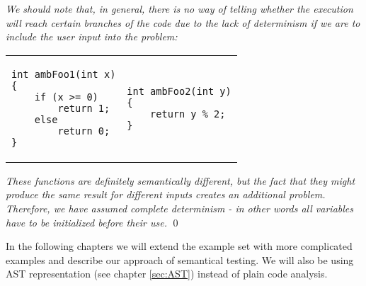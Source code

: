 \begin{exmp}
\textit{We should note that, in general, there is no way of telling whether the execution will reach certain branches of the code due to the lack of determinism if we are to include the user input into the problem:}

\begin{tabular}{ p{4.5cm} p{4.5cm} }
\begin{lstlisting}
int ambFoo1(int x)
{
    if (x >= 0)
        return 1;
    else
        return 0;
}
\end{lstlisting}
&
\begin{lstlisting}
int ambFoo2(int y)
{
    return y % 2;
}
\end{lstlisting}
\end{tabular}

\textit{These functions are definitely semantically different, but the fact that they might produce the same result for different inputs creates an additional problem. Therefore, we have assumed complete determinism - in other words all variables have to be initialized before their use.}
\qed
\end{exmp}

In the following chapters we will extend the example set with more complicated examples and describe our approach of semantical testing. We will also be using AST representation (see chapter \ref{sec:AST}) instead of plain code analysis.
